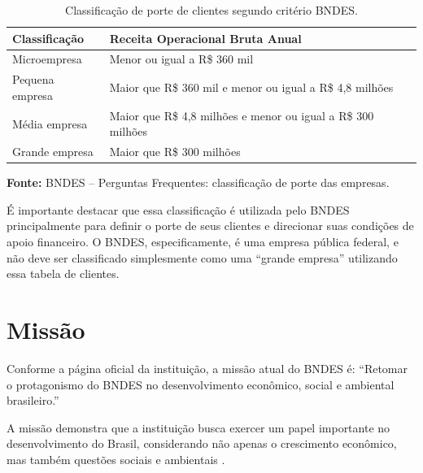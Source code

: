 \begin{table}[htbp]
    \centering
    \caption{Classificação de porte de clientes segundo critério BNDES.}
    \label{tab:porte}
    \vspace{0.3cm}
    \begin{tabularx}{\textwidth}{l X}
        \toprule
        \textbf{Classificação} & \textbf{Receita Operacional Bruta Anual}                     \\
        \midrule
        Microempresa           & Menor ou igual a R\$ 360 mil                                 \\
        Pequena empresa        & Maior que R\$ 360 mil e menor ou igual a R\$ 4,8 milhões     \\
        Média empresa          & Maior que R\$ 4,8 milhões e menor ou igual a R\$ 300 milhões \\
        Grande empresa         & Maior que R\$ 300 milhões                                    \\
        \bottomrule
    \end{tabularx}
    \vspace{0.2cm}
    \begin{flushleft}
        \centering
        \footnotesize\textbf{Fonte:} BNDES -- Perguntas Frequentes: classificação de porte das empresas.
    \end{flushleft}
\end{table}

É importante destacar que essa classificação é utilizada pelo BNDES principalmente para definir o porte de seus clientes e direcionar suas condições de apoio financeiro. O BNDES, especificamente, é uma empresa pública federal, e não deve ser classificado simplesmente como uma \enquote{grande empresa} utilizando essa tabela de clientes.


\section{Missão}

Conforme a página oficial da instituição, a missão atual do BNDES é: \enquote{Retomar o protagonismo do BNDES no desenvolvimento econômico, social e ambiental brasileiro.}\cite{bndes2026planejamento}

A missão demonstra que a instituição busca exercer um papel importante no desenvolvimento do Brasil, considerando não apenas o crescimento econômico, mas também questões sociais e ambientais \cite{bndes2026planejamento}.

